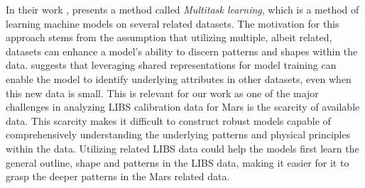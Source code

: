 In their work \citet{caruana_no_1997}, presents a method called \textit{Multitask learning}, which is a method of learning machine models on several related datasets. 
The motivation for this approach stems from the assumption that utilizing multiple, albeit related, datasets can enhance a model's ability to discern patterns and shapes within the data.
\citet{caruana_no_1997} suggests that leveraging shared representations for model training can enable the model to identify underlying attributes in other datasets, even when this new data is small.
This is relevant for our work as one of the major challenges in analyzing LIBS calibration data for Mars is the scarcity of available data.
This scarcity makes it difficult to construct robust models capable of comprehensively understanding the underlying patterns and physical principles within the data.
Utilizing related LIBS data could help the models first learn the general outline, shape and patterns in the LIBS data, making it easier for it to grasp the deeper patterns in the Mars related data.


